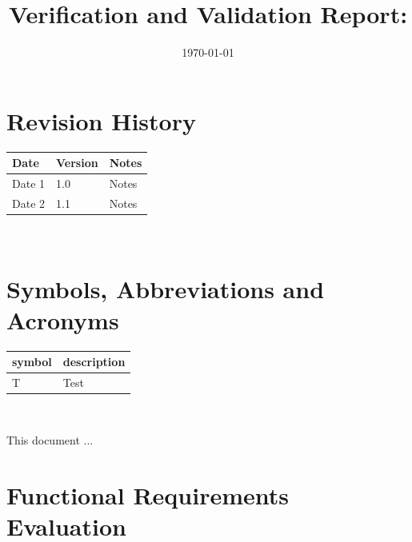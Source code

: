 \documentclass[12pt, titlepage]{article}
\begin{document}
\title{Verification and Validation Report: \progname} 
\author{\authname}
\date{\today}
	
\maketitle


\section{Revision History}

\begin{tabularx}{\textwidth}{p{3cm}p{2cm}X}
\toprule {\bf Date} & {\bf Version} & {\bf Notes}\\
\midrule
Date 1 & 1.0 & Notes\\
Date 2 & 1.1 & Notes\\
\bottomrule
\end{tabularx}

~\newpage

\section{Symbols, Abbreviations and Acronyms}

\renewcommand{\arraystretch}{1.2}
\begin{tabular}{l l} 
  \toprule		
  \textbf{symbol} & \textbf{description}\\
  \midrule 
  T & Test\\
  \bottomrule
\end{tabular}\\


\newpage

\tableofcontents

\listoftables %

\listoffigures %

\newpage


This document ...

\section{Functional Requirements Evaluation}
\end{document}
